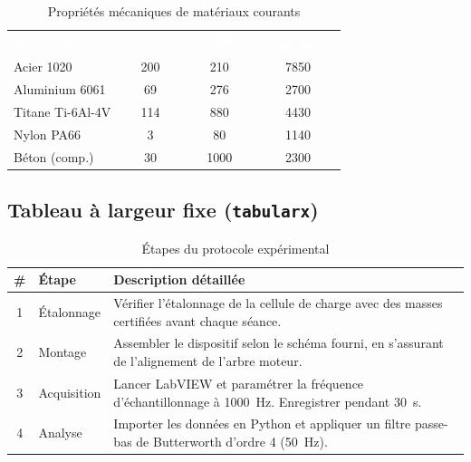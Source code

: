 \documentclass{poly}
\begin{document}
\begin{table}[!ht]
    \caption{Propriétés mécaniques de matériaux courants}
    \label{tab:materiaux}
    \begin{center}
        \begin{tabular}{l
                        S[table-format=3.0]
                        S[table-format=4.0]
                        S[table-format=4.0]}
            \textcolor{white}{\textbf{Matériau}} &
            \textcolor{white}{\textbf{$E$ (\si{\giga\pascal})}} &
            \textcolor{white}{\textbf{$\sigma_y$ (\si{\mega\pascal})}} &
            \textcolor{white}{\textbf{$\rho$ (\si{\kilogram\per\cubic\metre})}} \\
             Acier 1020       & 200 &  210 & 7850 \\
                               Aluminium 6061   &  69 &  276 & 2700 \\
             Titane Ti-6Al-4V & 114 &  880 & 4430 \\
                               Nylon PA66       &   3 &   80 & 1140 \\
             Béton (comp.)    &  30 & 1000 & 2300 \\
        \end{tabular}
    \end{center}
\end{table}

\subsection{Tableau à largeur fixe (\texttt{tabularx})}

\begin{table}[!ht]
    \caption{Étapes du protocole expérimental}
    \label{tab:proto}
    \begin{center}
        \begin{tabularx}{0.92\textwidth}{c l X}
            \toprule
            \textbf{\#} & \textbf{Étape} & \textbf{Description détaillée} \\
            \midrule
            1 & Étalonnage &
                Vérifier l'étalonnage de la cellule de charge avec des
                masses certifiées avant chaque séance. \\
            2 & Montage &
                Assembler le dispositif selon le schéma fourni, en
                s'assurant de l'alignement de l'arbre moteur. \\
            3 & Acquisition &
                Lancer LabVIEW et paramétrer la fréquence d'échantillonnage
                à \SI{1000}{\hertz}. Enregistrer pendant \SI{30}{\second}. \\
            4 & Analyse &
                Importer les données en Python et appliquer un filtre
                passe-bas de Butterworth d'ordre 4 (\SI{50}{\hertz}). \\
            \bottomrule
        \end{tabularx}
    \end{center}
\end{table}
\end{document}
